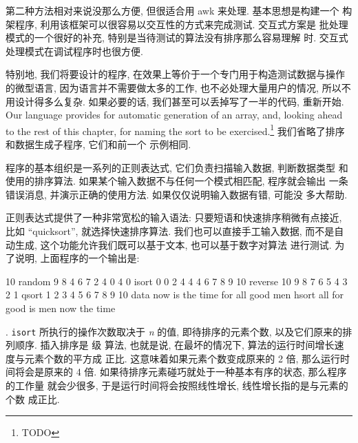 第二种方法相对来说没那么方便, 但很适合用 awk 来处理. 基本思想是构建一个
构架程序, 利用该框架可以很容易以交互性的方式来完成测试. 交互式方案是
批处理模式的一个很好的补充, 特别是当待测试的算法没有排序那么容易理解
时. 交互式处理模式在调试程序时也很方便.

特别地, 我们将要设计的程序, 在效果上等价于一个专门用于构造测试数据与操作
的微型语言, 因为语言并不需要做太多的工作, 也不必处理大量用户的情况,
所以不用设计得多么复杂. 如果必要的话, 我们甚至可以丢掉写了一半的代码,
重新开始. Our language provides for automatic generation of an array, and,
looking ahead to the rest of this chapter, for naming the sort to be
exercised.\footnote{TODO} 我们省略了排序和数据生成子程序, 它们和前一个
示例相同.

程序的基本组织是一系列的正则表达式, 它们负责扫描输入数据, 判断数据类型
和使用的排序算法. 如果某个输入数据不与任何一个模式相匹配, 程序就会输出
一条错误消息, 并演示正确的使用方法. 如果仅仅说明输入数据有错, 可能没
多大帮助.

正则表达式提供了一种非常宽松的输入语法: 只要短语和快速排序稍微有点接近,
比如 ``quicksort'', 就选择快速排序算法. 我们也可以直接手工输入数据, 
而不是自动生成, 这个功能允许我们既可以基于文本, 也可以基于数字对算法
进行测试. 为了说明, 上面程序的一个输出是:
\begin{shell}
    10 random 
     9 8 4 6 7 2 4 0 4 0
    isort 
     0 0 2 4 4 4 6 7 8 9
    10 reverse 
     10 9 8 7 6 5 4 3 2 1
    qsort
     1 2 3 4 5 6 7 8 9 10 
    data now is the time for all good men
    hsort
     all for good is men now the time
\end{shell}

. \texttt{isort} 所执行的操作次数取决于 \textit{n} 的值,
即待排序的元素个数, 以及它们原来的排列顺序. 插入排序是  级
算法, 也就是说, 在最坏的情况下, 算法的运行时间增长速度与元素个数的平方成
正比. 这意味着如果元素个数变成原来的 2 倍, 那么运行时间将会是原来的
4 倍. 如果待排序元素碰巧就处于一种基本有序的状态, 那么程序的工作量
就会少很多, 于是运行时间将会按照线性增长, 线性增长指的是与元素的个数
成正比.
